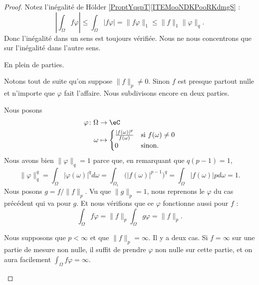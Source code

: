 \begin{proof}
	Notez l'inégalité de Hölder \ref{ProptYqspT}\ref{ITEMooNDKPooRKdmgS} :
	\begin{equation}
		| \int_{\Omega}f\varphi |\leq \int_{\Omega}| f\varphi |=\| f\varphi \|_1\leq \| f \|_1\| \varphi \|_q.
	\end{equation}
	Donc l'inégalité dans un sens est toujours vérifiée. Nous ne nous concentrons que sur l'inégalité dans l'autre sens.

	En plein de parties.
	\begin{subproof}
		Notons tout de suite qu'on suppose \( \| f \|_p\neq 0\). Sinon \( f\) est presque partout nulle et n'importe que \( \varphi\) fait l'affaire. Nous subdivisons encore en deux parties.
		\begin{subproof}
			\spitem[Si \( \| f \|_p=1\)]
			Nous posons
			\begin{equation}
				\begin{aligned}
					\varphi\colon \Omega & \to \eC                                                                    \\
					\omega               & \mapsto \begin{cases}
						                               \frac{ | f(\omega) |^p }{ f(\omega) } & \text{si } f(\omega)\neq 0 \\
						                               0                                     & \text{sinon. }
					                               \end{cases}
				\end{aligned}
			\end{equation}
			Nous avons bien \( \| \varphi \|_q=1\) parce que, en remarquant que \( q(p-1)=1\),
			\begin{equation}
				\| \varphi \|_q^q=\int_{\Omega}| \varphi(\omega) |^qd\omega=\int_{\Omega_1}\big( | f(\omega) |^{p-1} \big)^q=\int_{\Omega}| f(\omega) |pd\omega=1.
			\end{equation}
			\spitem[Si \( \| f \|_p<\infty\)]
			Nous posons \( g=f/\| f \|_p\). Vu que \( \| g \|_p=1\), nous reprenons le \( \varphi\) du cas précédent qui va pour \( g\). Et nous vérifions que ce \( \varphi\) fonctionne aussi pour \( f\) :
			\begin{equation}
				\int_{\Omega}f\varphi=\| f \|_p\int_{\Omega}g\varphi=\| f \|_p.
			\end{equation}
		\end{subproof}
		\spitem[Pour \ref{ITEMooBZXAooAfgWvF}, avec \( p<\infty\) et \( \| f \|_p=\infty\)]
		Nous supposons que \( p<\infty\) et que \( \| f \|_p=\infty\). Il y a deux cas. Si \( f=\infty\) sur une partie de mesure non nulle, il suffit de prendre \( \varphi\) non nulle sur cette partie, et on aura facilement \( \int_{\Omega}f\varphi=\infty\).


\end{subproof}
\end{proof}
